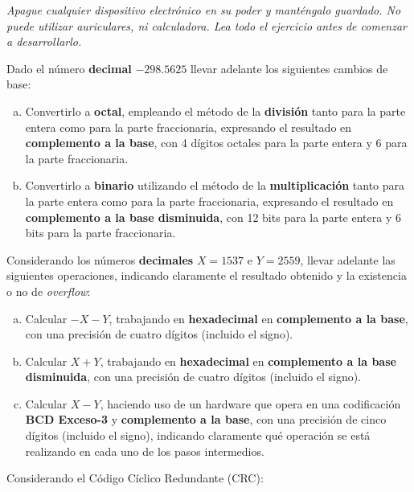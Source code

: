 \documentclass[12pt,a4paper]{article}
\begin{document}

\begin{center}
	\emph{Apague cualquier dispositivo electrónico en su poder y manténgalo guardado. No puede utilizar auriculares, ni calculadora. Lea todo el ejercicio antes de comenzar a desarrollarlo.}
\end{center}

Dado el número \textbf{decimal} $-298.5625$ llevar adelante los siguientes cambios de base:
\begin{enumerate}[a)]
	\item Convertirlo a \textbf{octal}, empleando el método de la \textbf{división} tanto para la parte entera como para la parte fraccionaria, expresando el resultado en \textbf{complemento a la base}, con 4 dígitos octales para la parte entera y 6 para la parte fraccionaria.

	\item Convertirlo a \textbf{binario} utilizando el método de la \textbf{multiplicación} tanto para la parte entera como para la parte fraccionaria, expresando el resultado en \textbf{complemento a la base disminuida}, con 12 bits para la parte entera y 6 bits para la parte fraccionaria.
\end{enumerate}

Considerando los números {\textbf{decimales}} $X = 1537$ e $Y = 2559$, llevar adelante las siguientes operaciones, indicando claramente el resultado obtenido y la existencia o no de \emph{overflow}:
\begin{enumerate}[a)]
	\item Calcular $- X - Y$, trabajando en \textbf{hexadecimal} en \textbf{complemento a la base}, con una precisión de cuatro dígitos (incluido el signo).
	\item Calcular $ X + Y $, trabajando en \textbf{hexadecimal} en \textbf{complemento a la base disminuida}, con una precisión de cuatro dígitos (incluido el signo).
	\item Calcular $X - Y$, haciendo uso de un hardware que opera en una codificación \textbf{BCD Exceso-3} y \textbf{complemento a la base}, con una precisión de cinco dígitos (incluido el signo), indicando claramente qué operación se está realizando en cada uno de los pasos intermedios.
\end{enumerate}

 Considerando el Código Cíclico Redundante (CRC):
\end{document}
